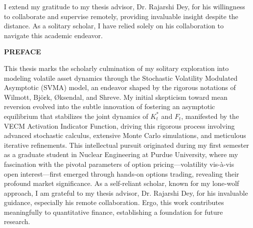 \documentclass[12pt]{report}
\begin{document}
\vspace{0.2in}

\normalsize %
I extend my gratitude to my thesis advisor, Dr. Rajarshi Dey, for his willingness to collaborate and supervise remotely, providing invaluable insight despite the distance. As a solitary scholar, I have relied solely on his collaboration to navigate this academic endeavor.
\newpage
\begin{center}
    \textbf{PREFACE}
\end{center}

\vspace{0.2in}

\normalsize %
This thesis marks the scholarly culmination of my solitary exploration into modeling volatile asset dynamics through the Stochastic Volatility Modulated Asymptotic (SVMA) model, an endeavor shaped by the rigorous notations of Wilmott, Björk, Øksendal, and Shreve. My initial skepticism toward mean reversion evolved into the subtle innovation of fostering an asymptotic equilibrium that stabilizes the joint dynamics of \(K_t^*\) and \(F_t\), manifested by the VECM Activation Indicator Function, driving this rigorous process involving advanced stochastic calculus, extensive Monte Carlo simulations, and meticulous iterative refinements. This intellectual pursuit originated during my first semester as a graduate student in Nuclear Engineering at Purdue University, where my fascination with the pivotal parameters of option pricing—volatility vis-à-vis open interest—first emerged through hands-on options trading, revealing their profound market significance. As a self-reliant scholar, known for my lone-wolf approach, I am grateful to my thesis advisor, Dr. Rajarshi Dey, for his invaluable guidance, especially his remote collaboration. Ergo, this work contributes meaningfully to quantitative finance, establishing a foundation for future research.
\newpage
\tableofcontents
{}
\clearpage
\newpage
\end{document}
